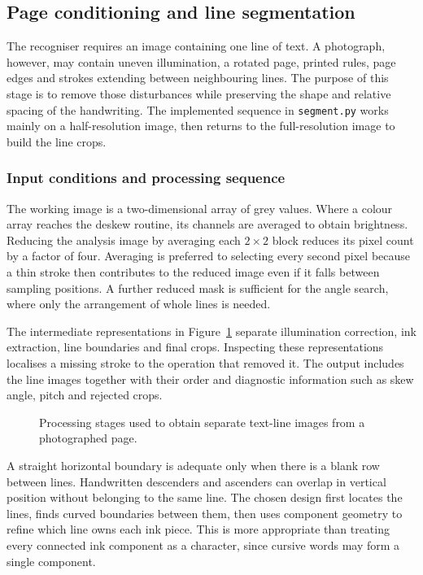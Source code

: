 \subsection{Page conditioning and line segmentation}
\label{sec:des-seg}
The recogniser requires an image containing one line of text. A photograph, however, may contain uneven illumination, a rotated page, printed rules, page edges and strokes extending between neighbouring lines. The purpose of this stage is to remove those disturbances while preserving the shape and relative spacing of the handwriting. The implemented sequence in \texttt{segment.py} works mainly on a half-resolution image, then returns to the full-resolution image to build the line crops.


\subsubsection{Input conditions and processing sequence}
The working image is a two-dimensional array of grey values. Where a colour array reaches the deskew routine, its channels are averaged to obtain brightness. Reducing the analysis image by averaging each $2\times2$ block reduces its pixel count by a factor of four. Averaging is preferred to selecting every second pixel because a thin stroke then contributes to the reduced image even if it falls between sampling positions. A further reduced mask is sufficient for the angle search, where only the arrangement of whole lines is needed.


The intermediate representations in Figure~\ref{fig:des-seg-stages} separate illumination correction, ink extraction, line boundaries and final crops. Inspecting these representations localises a missing stroke to the operation that removed it. The output includes the line images together with their order and diagnostic information such as skew angle, pitch and rejected crops.


\begin{figure}[!htbp]\centering
{}
\caption{Processing stages used to obtain separate text-line images from a photographed page.}
\label{fig:des-seg-stages}
\end{figure}

A straight horizontal boundary is adequate only when there is a blank row between lines. Handwritten descenders and ascenders can overlap in vertical position without belonging to the same line. The chosen design first locates the lines, finds curved boundaries between them, then uses component geometry to refine which line owns each ink piece. This is more appropriate than treating every connected ink component as a character, since cursive words may form a single component.

